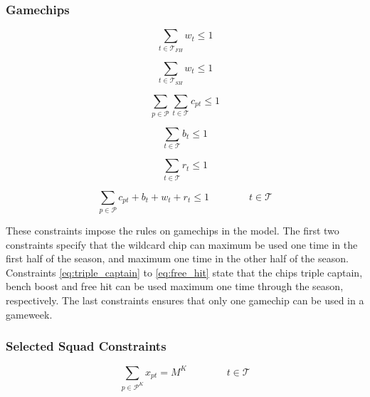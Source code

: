 \subsubsection{Gamechips} \label{gamechips}


\begin{equation} \label{eq:wildcard_first_half_of_the_season}
    \sum_{t \in \mathcal{T}_{FH}} w_{t} \leq 1
\end{equation}

\begin{equation} \label{eq:wildcard_second_half_of_the_season}
    \sum_{t \in \mathcal{T}_{SH}} w_{t} \leq 1
\end{equation}


\begin{equation} \label{eq:triple_captain} 
    \sum_{p \in \mathcal{P}} \sum_{t \in \mathcal{T}} c_{pt} \leq 1
\end{equation}

\begin{equation} \label{eq:bench_boost}
    \sum_{t \in \mathcal{T}} b_{t} \leq 1
\end{equation}

\begin{equation} \label{eq:free_hit}
    \sum_{t \in \mathcal{T}} r_{t} \leq 1
\end{equation}

\begin{equation} \label{eq:all_gamechips}
    \sum_{p \in \mathcal{P}} c_{pt} + b_{t} + w_{t} + r_{t} \leq 1 \qquad \qquad t \in \mathcal{T}
\end{equation}

These constraints impose the rules on gamechips in the model. The first two constraints specify that the wildcard chip can maximum be used one time in the first half of the season, and maximum one time in the other half of the season. Constraints \eqref{eq:triple_captain} to \eqref{eq:free_hit} state that the chips triple captain, bench boost and free hit can be used maximum one time through the season, respectively. The last constraints ensures that only one gamechip can be used in a gameweek.  

\subsubsection{Selected Squad Constraints} \label{team_sel}
\begin{equation} \label{eq:sel_keeper}
    \sum_{p \in \mathcal{P}^{K}} x_{pt} = M^{K} \qquad\qquad t \in \mathcal{T}
\end{equation}

